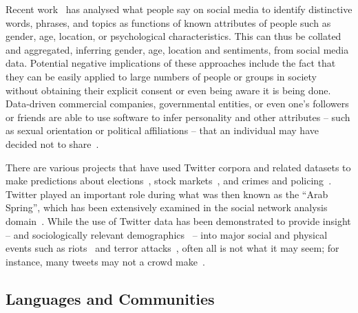 \documentclass[conference]{IEEEtran}
\begin{document}

Recent
work~\cite{blamey-et-al-2012,schwartz-et-al:2013,blamey-et-al-2013,oatley+crick:2014,mostafa-et-al-ai2016}
has analysed what people say on social media to identify distinctive
words, phrases, and topics as functions of known attributes of people
such as gender, age, location, or psychological characteristics. This
can thus be collated and aggregated, inferring gender, age, location
and sentiments, from social media data. Potential negative
implications of these approaches include the fact that they can be
easily applied to large numbers of people or groups in society without
obtaining their explicit consent or even being aware it is being
done. Data-driven commercial companies, governmental entities, or
even one's followers or friends are able to use software to infer
personality and other attributes -- such as sexual orientation or
political affiliations -- that an individual may have decided not to
share~\cite{lambiotte+kosinski:2014,postsm:2014}.

There are various projects that have used Twitter corpora and related
datasets to make predictions about
elections~\cite{tumasjan-et-al:2010}, stock
markets~\cite{zhang-et-al:2011}, and crimes and
policing~\cite{gerber:2014,oatley+crick:2015}. Twitter
played an important role during what was then known as the ``Arab
Spring'', which has been extensively examined in the social network
analysis
domain~\cite{lotan-et-al:2011,howard-et-al:2011,comunello+anzera:2012,wolfsfeld-et-al:2013,bruns-et-al:2013}.
While the use of Twitter data has been demonstrated to provide insight
-- and sociologically relevant demographics~\cite{sloan-et-al:2013} --
into major social and physical events such as
riots~\cite{procter-et-al:2013} and terror
attacks~\cite{burnap-et-al:2014}, often all is not what it may seem;
for instance, many tweets may not a crowd make~\cite{liang-et-al:2013}.

\subsection{Languages and Communities}
\end{document}
